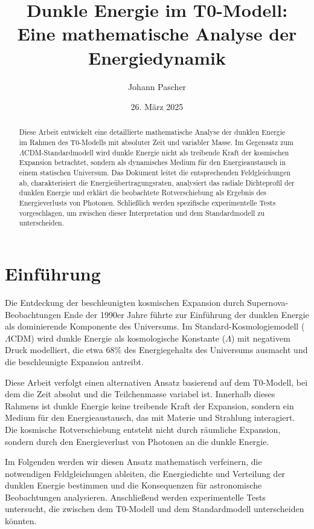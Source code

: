 \documentclass[a4paper,12pt]{article}
\theoremstyle{definition}
\theoremstyle{remark}
\begin{document}
	
	\title{Dunkle Energie im T0-Modell: \\Eine mathematische Analyse der Energiedynamik}
	\author{Johann Pascher}
	\date{26. März 2025}
	\maketitle
	
	\begin{abstract}
		Diese Arbeit entwickelt eine detaillierte mathematische Analyse der dunklen Energie im Rahmen des T0-Modells mit absoluter Zeit und variabler Masse. Im Gegensatz zum $\Lambda$CDM-Standardmodell wird dunkle Energie nicht als treibende Kraft der kosmischen Expansion betrachtet, sondern als dynamisches Medium für den Energieaustausch in einem statischen Universum. Das Dokument leitet die entsprechenden Feldgleichungen ab, charakterisiert die Energieübertragungsraten, analysiert das radiale Dichteprofil der dunklen Energie und erklärt die beobachtete Rotverschiebung als Ergebnis des Energieverlusts von Photonen. Schließlich werden spezifische experimentelle Tests vorgeschlagen, um zwischen dieser Interpretation und dem Standardmodell zu unterscheiden.
	\end{abstract}
	
	\tableofcontents
	\newpage
	
	\section{Einführung}
	Die Entdeckung der beschleunigten kosmischen Expansion durch Supernova-Beobachtungen Ende der 1990er Jahre führte zur Einführung der dunklen Energie als dominierende Komponente des Universums. Im Standard-Kosmologiemodell ($\Lambda$CDM) wird dunkle Energie als kosmologische Konstante ($\Lambda$) mit negativem Druck modelliert, die etwa 68\% des Energiegehalts des Universums ausmacht und die beschleunigte Expansion antreibt.
	
	Diese Arbeit verfolgt einen alternativen Ansatz basierend auf dem T0-Modell, bei dem die Zeit absolut und die Teilchenmasse variabel ist. Innerhalb dieses Rahmens ist dunkle Energie keine treibende Kraft der Expansion, sondern ein Medium für den Energieaustausch, das mit Materie und Strahlung interagiert. Die kosmische Rotverschiebung entsteht nicht durch räumliche Expansion, sondern durch den Energieverlust von Photonen an die dunkle Energie.
	
	Im Folgenden werden wir diesen Ansatz mathematisch verfeinern, die notwendigen Feldgleichungen ableiten, die Energiedichte und Verteilung der dunklen Energie bestimmen und die Konsequenzen für astronomische Beobachtungen analysieren. Anschließend werden experimentelle Tests untersucht, die zwischen dem T0-Modell und dem Standardmodell unterscheiden könnten.
	
\end{document}
